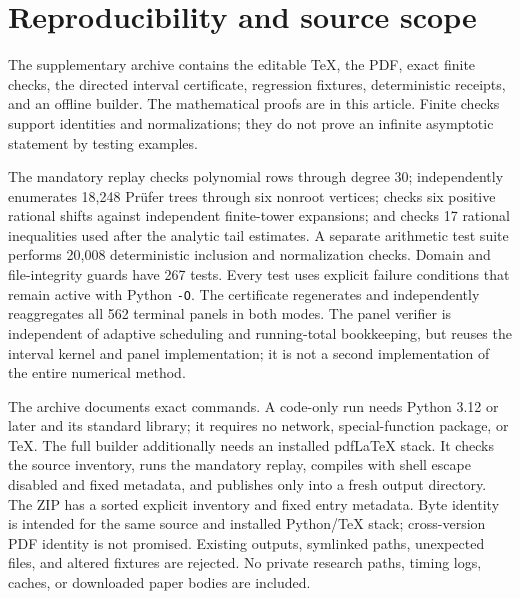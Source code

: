\documentclass[11pt]{article}
\theoremstyle{remark}\newtheorem{remark}[theorem]{Remark}
\begin{document}
\section{Reproducibility and source scope}\label{xtw:frac:sec:reproducibility}
The supplementary archive contains the editable TeX, the PDF, exact
finite checks, the directed interval certificate, regression fixtures,
deterministic receipts, and an offline builder. The mathematical proofs are
in this article. Finite checks support identities and normalizations;
they do not prove an infinite asymptotic statement by testing examples.

The mandatory replay checks polynomial rows through degree 30; independently
enumerates 18,248 Pr\"ufer trees through six nonroot vertices; checks six
positive rational shifts against independent finite-tower expansions;
and checks 17 rational inequalities used after the analytic tail estimates.
A separate arithmetic test suite performs 20,008 deterministic inclusion
and normalization checks. Domain and file-integrity guards have 267 tests.
Every test uses explicit failure conditions that remain active with
Python \texttt{-O}. The certificate regenerates and independently
reaggregates all 562 terminal panels in both modes. The panel verifier
is independent of adaptive scheduling and running-total bookkeeping, but
reuses the interval kernel and panel implementation; it is not a second
implementation of the entire numerical method.

The archive documents exact commands. A code-only run needs Python 3.12
or later and its standard library; it requires no network, special-function
package, or TeX. The full builder additionally needs an installed pdfLaTeX
stack. It checks the source inventory, runs the mandatory replay, compiles
with shell escape disabled and fixed metadata, and publishes only into a
fresh output directory. The ZIP has a sorted explicit inventory and fixed
entry metadata. Byte identity is intended for the same source and installed
Python/TeX stack; cross-version PDF identity is not promised. Existing
outputs, symlinked paths, unexpected files, and altered fixtures are
rejected. No private research paths, timing logs, caches, or downloaded
paper bodies are included.
\end{document}
